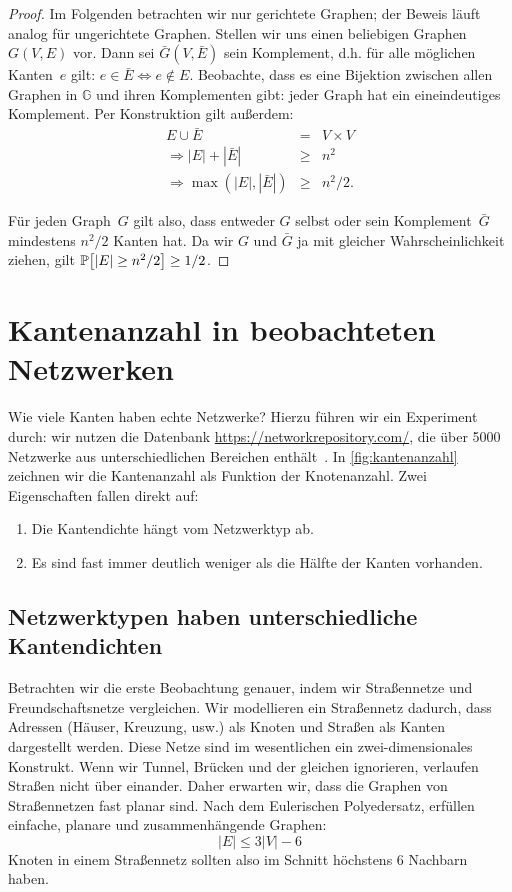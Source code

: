 \begin{proof}
    Im Folgenden betrachten wir nur gerichtete Graphen; der Beweis läuft analog für ungerichtete Graphen.
    Stellen wir uns einen beliebigen Graphen~$G(V, E)$ vor.
    Dann sei $\bar G(V, \bar E)$ sein Komplement, d.h. für alle möglichen Kanten~$e$ gilt: $e \in \bar E \Leftrightarrow e \notin E$.
    Beobachte, dass es eine Bijektion zwischen allen Graphen in $\mathbb G$ und ihren Komplementen gibt: jeder Graph hat ein eineindeutiges Komplement.
    Per Konstruktion gilt außerdem:
    \begin{eqnarray}
        E \cup \bar E &=& V \times V\\
        \Rightarrow |E| + |\bar E| &\ge& n^2\\
        \Rightarrow \max(|E|, |\bar E|) &\ge& n^2 / 2.
    \end{eqnarray}

    Für jeden Graph~$G$ gilt also, dass entweder $G$ selbst oder sein Komplement~$\bar G$ mindestens $n^2 / 2$ Kanten hat.
    Da wir $G$ und $\bar G$ ja mit gleicher Wahrscheinlichkeit ziehen, gilt $\mathbb{P}\!\left[|E| \ge n^2 / 2\right] \ge 1/2$.
\end{proof}

\section{Kantenanzahl in beobachteten Netzwerken}\label{sec:kanten-in-beobachteten-netzen}
Wie viele Kanten haben echte Netzwerke? Hierzu führen wir ein Experiment durch:
wir nutzen die Datenbank \url{https://networkrepository.com/}, die über 5000 Netzwerke aus unterschiedlichen Bereichen enthält~\cite{networkrepository}.
In \cref{fig:kantenanzahl} zeichnen wir die Kantenanzahl als Funktion der Knotenanzahl.
Zwei Eigenschaften fallen direkt auf:
\begin{enumerate}
    \item Die Kantendichte hängt vom Netzwerktyp ab.
    \item Es sind fast immer deutlich weniger als die Hälfte der Kanten vorhanden.
\end{enumerate}

\subsection{Netzwerktypen haben unterschiedliche Kantendichten}
Betrachten wir die erste Beobachtung genauer, indem wir Straßennetze und Freundschaftsnetze vergleichen.
Wir modellieren ein Straßennetz dadurch, dass Adressen (Häuser, Kreuzung, usw.) als Knoten und Straßen als Kanten dargestellt werden.
Diese Netze  sind im wesentlichen ein zwei-dimensionales Konstrukt.
Wenn wir Tunnel, Brücken und der gleichen ignorieren, verlaufen Straßen nicht über einander.
Daher erwarten wir, dass die Graphen von Straßennetzen fast planar sind.
Nach dem Eulerischen Polyedersatz, erfüllen einfache,  planare und zusammenhängende Graphen:
\begin{equation}
    |E| \le 3 |V| - 6
\end{equation}
Knoten in einem Straßennetz sollten also im Schnitt höchstens 6 Nachbarn haben.

